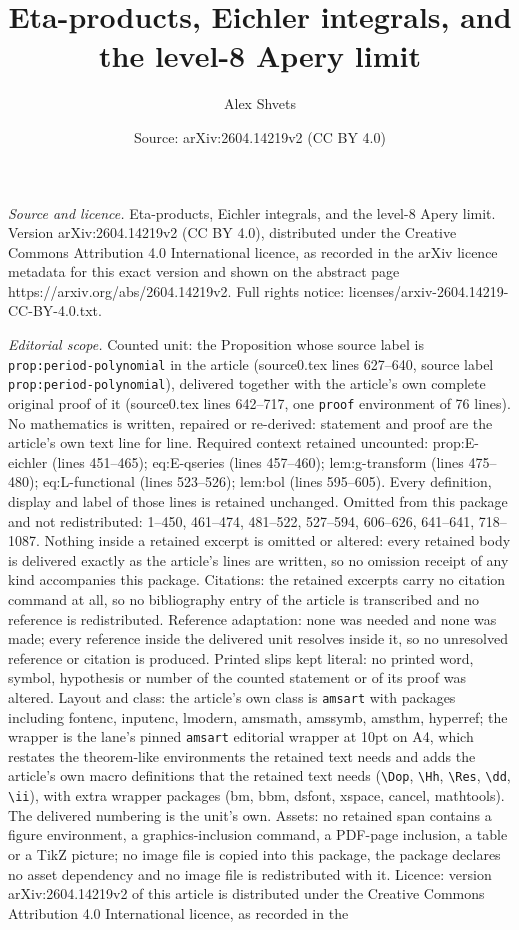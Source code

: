 \documentclass[10pt,a4paper]{amsart}
\title[Eta-products, Eichler integrals, and the level-8 Apery limit]{Eta-products, Eichler integrals, and the level-8 Apery limit}
\author{Alex Shvets}
\date{Source: arXiv:2604.14219v2 (CC BY 4.0)}
\begin{document}
\maketitle

\noindent\emph{Source and licence.} Eta-products, Eichler integrals, and the level-8 Apery limit. Version arXiv:2604.14219v2 (CC BY 4.0), distributed under the Creative Commons Attribution 4.0 International licence, as recorded in the arXiv licence metadata for this exact version and shown on the abstract page https://arxiv.org/abs/2604.14219v2. Full rights notice: licenses/arxiv-2604.14219-CC-BY-4.0.txt.\par\smallskip

\noindent\textit{Editorial scope.} Counted unit: the Proposition whose source label is \texttt{prop:period-polynomial} in the article (source0.tex lines 627--640, source label \texttt{prop:period-polynomial}), delivered together with the article's own complete original proof of it (source0.tex lines 642--717, one \texttt{proof} environment of 76 lines). No mathematics is written, repaired or re-derived: statement and proof are the article's own text line for line. Required context retained uncounted: prop:E-eichler (lines 451--465); eq:E-qseries (lines 457--460); lem:g-transform (lines 475--480); eq:L-functional (lines 523--526); lem:bol (lines 595--605). Every definition, display and label of those lines is retained unchanged. Omitted from this package and not redistributed: 1--450, 461--474, 481--522, 527--594, 606--626, 641--641, 718--1087. Nothing inside a retained excerpt is omitted or altered: every retained body is delivered exactly as the article's lines are written, so no omission receipt of any kind accompanies this package. Citations: the retained excerpts carry no citation command at all, so no bibliography entry of the article is transcribed and no reference is redistributed. Reference adaptation: none was needed and none was made; every reference inside the delivered unit resolves inside it, so no unresolved reference or citation is produced. Printed slips kept literal: no printed word, symbol, hypothesis or number of the counted statement or of its proof was altered. Layout and class: the article's own class is \texttt{amsart} with packages including fontenc, inputenc, lmodern, amsmath, amssymb, amsthm, hyperref; the wrapper is the lane's pinned \texttt{amsart} editorial wrapper at 10pt on A4, which restates the theorem-like environments the retained text needs and adds the article's own macro definitions that the retained text needs (\texttt{\textbackslash Dop}, \texttt{\textbackslash Hh}, \texttt{\textbackslash Res}, \texttt{\textbackslash dd}, \texttt{\textbackslash ii}), with extra wrapper packages (bm, bbm, dsfont, xspace, cancel, mathtools). The delivered numbering is the unit's own. Assets: no retained span contains a figure environment, a graphics-inclusion command, a PDF-page inclusion, a table or a TikZ picture; no image file is copied into this package, the package declares no asset dependency and no image file is redistributed with it. Licence: version arXiv:2604.14219v2 of this article is distributed under the Creative Commons Attribution 4.0 International licence, as recorded in the 
\end{document}
